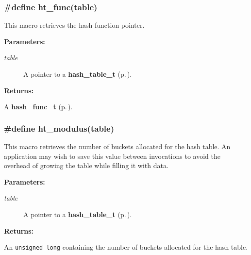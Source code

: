 \subsubsection{\setlength{\rightskip}{0pt plus 5cm}\#define ht\_\-func(table)}\label{group__dbprim__hash_a24}




 This macro retrieves the hash function pointer.\begin{Desc}
\item[{\bf Parameters: }]\par
\begin{description}
\item[
{\em table}]A pointer to a {\bf hash\_\-table\_\-t} {\rm (p.\,\pageref{group__dbprim__hash_a0})}.

\end{description}
\end{Desc}
\begin{Desc}
\item[{\bf Returns: }]\par
A {\bf hash\_\-func\_\-t} {\rm (p.\,\pageref{group__dbprim__hash_a3})}. \end{Desc}
\subsubsection{\setlength{\rightskip}{0pt plus 5cm}\#define ht\_\-modulus(table)}\label{group__dbprim__hash_a22}




 This macro retrieves the number of buckets allocated for the hash table. An application may wish to save this value between invocations to avoid the overhead of growing the table while filling it with data.\begin{Desc}
\item[{\bf Parameters: }]\par
\begin{description}
\item[
{\em table}]A pointer to a {\bf hash\_\-table\_\-t} {\rm (p.\,\pageref{group__dbprim__hash_a0})}.

\end{description}
\end{Desc}
\begin{Desc}
\item[{\bf Returns: }]\par
An {\tt unsigned long} containing the number of buckets allocated for the hash table. \end{Desc}
